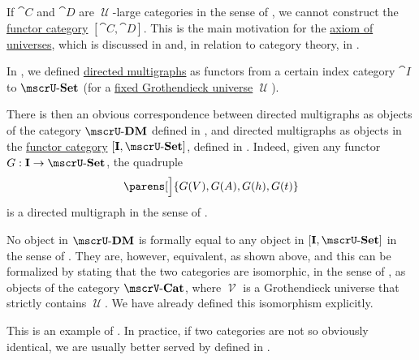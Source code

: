 \begin{remark}\label{rem:functor_category_size}
  If \( \cat{C} \) and \( \cat{D} \) are \( \mscrU \)-large categories in the sense of , we cannot construct the \hyperref[def:functor_category]{functor category} \( [\cat{C}, \cat{D}] \). This is the main motivation for the \hyperref[def:axiom_of_universes]{axiom of universes}, which is discussed in  and, in relation to category theory, in .
\end{remark}

\begin{example}\label{ex:isomorphism_of_directed_multigraph_categories}
  In , we defined \hyperref[def:directed_multigraph]{directed multigraphs} as functors from a certain index category \( \cat{I} \) to \( \ucat{Set} \) (for a \hyperref[def:category_size]{fixed Grothendieck universe} \( \mscrU \)).

  There is then an obvious correspondence between directed multigraphs as objects of the category \( \ucat{DM} \) defined in , and directed multigraphs as objects in the \hyperref[def:functor_category]{functor category} \( [\cat{I}, \ucat{Set}] \), defined in . Indeed, given any functor \( G: \cat{I} \to \ucat{Set} \), the quadruple
  \begin{equation*}
    \parens[\Big]{ G(V), G(A), G(h), G(t) }
  \end{equation*}
  is a directed multigraph in the sense of .

  No object in \( \ucat{DM} \) is formally equal to any object in \( [\cat{I}, \ucat{Set}] \) in the sense of \hyperref[def:zfc]{}. They are, however, equivalent, as shown above, and this can be formalized by stating that the two categories are isomorphic, in the sense of , as objects of the category \( \ucat[\mscrV]{Cat} \), where \( \mscrV \) is a Grothendieck universe that strictly contains \( \mscrU \). We have already defined this isomorphism explicitly.

  This is an example of . In practice, if two categories are not so obviously identical, we are usually better served by  defined in .
\end{example}

